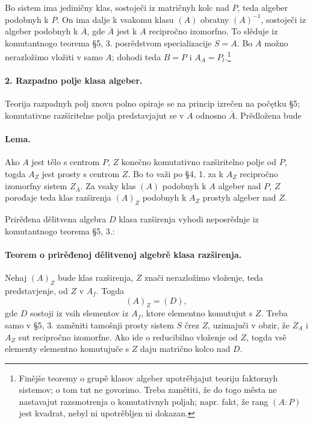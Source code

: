\documentclass[11pt]{article}
\begin{document}
Bo sistem ima jediničny klas, sostoječi iz matričnyh kolc nad \(P\), teda algeber podobnyh k \(P\). On ima dalje k vsakomu klasu \((A)\) obratny \((A)^{-1}\), sostoječi iz algeber podobnyh k \(\overline A\), gde \(\overline A\) jest k \(A\) recipročno izomorfno. To slěduje iz komutantnogo teorema §5, 3. posrědstvom specializacije \(S=A\). Bo \(A\) možno nerazložimo vložiti v samo \(A\); dohodi teda \(B=P\) i \(A_A=P_t\).\footnote{Finějše teoremy o grupě klasov algeber upotrěbjajut teoriju faktornyh sistemov; o tom tut ne govorimo. Treba zamětiti, že do togo města ne nastavajut razsmotrenja o komutativnyh poljah; napr. fakt, že rang \((A:P)\) jest kvadrat, nebyl ni upotrěbljen ni dokazan.}

\paragraph{2. Razpadno polje klasa algeber.}
Teorija razpadnyh polj znovu polno opiraje se na princip izrečen na počętku §5; komutativne razširitelne polja predstavjajut se v \(A\) odnosno \(\overline A\). Prědložena bude

\paragraph{Lema.}
Ako \(A\) jest tělo s centrom \(P\), \(Z\) konečno komutativno razširitelno polje od \(P\), togda \(A_Z\) jest prosty s centrom \(Z\). Bo to važi po §4, 1. za k \(A_Z\) recipročno izomorfny sistem \(Z_{\overline A}\). Za vsaky klas \((A)\) podobnyh k \(A\) algeber nad \(P\), \(Z\) porođaje teda klas razširenja \((A)_Z\) podobnyh k \(A_Z\) prostyh algeber nad \(Z\).

Prirěđena dělitvena algebra \(D\) klasa razširenja vyhodi neposrědnje iz komutantnogo teorema §5, 3.:

\paragraph{Teorem o prirěđenoj dělitvenoj algebrě klasa razširenja.}
Nehaj \((A)_Z\) bude klas razširenja, \(Z\) znači nerazložimo vloženje, teda predstavjenje, od \(Z\) v \(A_f\). Togda
\[
        (A)_Z=(D),
\]
gde \(D\) sostoji iz vsih elementov iz \(A_f\), ktore elementno komutujut s \(Z\). Treba samo v §5, 3. zaměniti tamošnji prosty sistem \(S\) črez \(Z\), uzimajuči v obzir, že \(Z_A\) i \(A_Z\) sut recipročno izomorfne. Ako ide o reducibilno vloženje od \(Z\), togda vsě elementy elementno komutujuče s \(Z\) daju matrično kolco nad \(D\).
\end{document}
